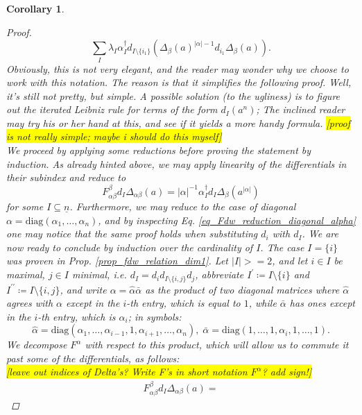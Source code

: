 \documentclass[10pt, a4paper, UKenglish]{article}
\numberwithin{equation}{section}
\newcommand{\defas}{\coloneqq}  %
\newcommand{\abs}[1]{\left\vert#1\right\vert}	%
\newcommand{\ind}[1]{\underline{#1}}
\renewcommand{\subset}{\subseteq}
\newcommand{\diag}{\mathrm{diag}}
\newcommand{\comm}[1]{\colorbox{yellow}{#1}}
\theoremstyle{plain}
\newtheorem{cor}[equation]{Corollary}
\theoremstyle{definition}
\begin{document}
\begin{cor}
\begin{proof}
\begin{equation*}
	\sum_I \lambda_I \alpha^\dagger_I d_{I \setminus \{i_1\}}
    (\Delta_{\beta}(a)^{\abs{\alpha}-1} d_{i_1} \Delta_{\beta}(a)).
\end{equation*}
Obviously, this is not very elegant, and the reader may wonder why we choose to work with this notation. The reason is that it simplifies the following proof. Well, it's still not pretty, but simple. A possible solution (to the ugliness) is to figure out the iterated Leibniz rule for terms of the form $d_I (a^n)$; The inclined reader may try his or her hand at this, and see if it yields a more handy formula. \comm{[proof is not really simple; maybe i should do this myself]}\\
We proceed by applying some reductions before proving the statement by induction. As already hinted above, we may apply linearity of the differentials in their subindex and reduce to
\begin{equation*}
  F_{\alpha\beta}^\beta d_I \Delta_{\alpha\beta} (a) =%
  \abs{\alpha}^{-1}\alpha^\dagger_I d_I \Delta_{\beta}(a^{\abs{\alpha}})%
\end{equation*}
for some $I \subset \ind{n}$. Furthermore, we may reduce to the case of diagonal $\alpha = \diag(\alpha_1, \ldots, \alpha_n)$, and by inspecting Eq. \ref{eq_Fdw_reduction_diagonal_alpha} one may notice that the same proof holds when substituting $d_i$ with $d_I$. We are now ready to conclude by induction over the cardinality of $I$. The case $I = \{i\}$ was proven in Prop. \ref{prop_fdw_relation_dim1}. Let $\abs{I} >= 2$, and let $i \in I$ be maximal, $j\in I$ minimal, i.e. $d_I = d_i d_{I \setminus \{i,j\}} d_j$, abbreviate $I^\prime \defas I \setminus \{i\}$ and $I^{\prime\prime} \defas I \setminus \{i,j\}$, and write $\alpha = \hat \alpha \bar \alpha$ as the product of two diagonal matrices where $\hat \alpha$ agrees with $\alpha$ except in the $i$-th entry, which is equal to $1$, while $\bar \alpha$ has ones except in the $i$-th entry, which is $\alpha_i$; in symbols:
\begin{equation*}
	\hat \alpha = \diag(\alpha_1, \ldots, \alpha_{i-1}, 1, \alpha_{i+1}, \ldots, \alpha_n),\;%
		\bar \alpha = \diag(1,\ldots,1,\alpha_i,1,\ldots,1).
\end{equation*}
We decompose $F^\alpha$ with respect to this product, which will allow us to commute it past some of the differentials, as follows:\\
\comm{[leave out indices of Delta's? Write F's in short notation $F^\alpha$? add sign!]}
\begin{gather*}
	F_{\alpha\beta}^\beta d_I \Delta_{\alpha\beta}(a) = %

\end{gather*}
\end{proof}
\end{cor}
\end{document}
